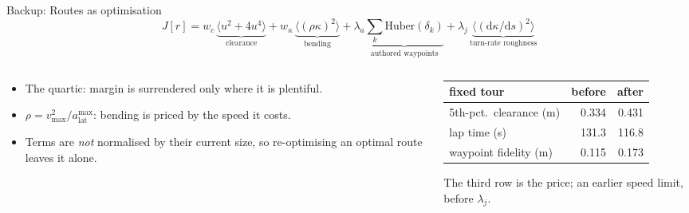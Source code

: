 \documentclass[10pt, aspectratio=169]{beamer}
\begin{document}
\begin{frame}{Backup: Routes as optimisation}
  \[
    J[r] = w_c\,\underbrace{\big\langle u^2+4u^4\big\rangle}_{\text{clearance}}
    + w_\kappa\,\underbrace{\big\langle(\rho\kappa)^2\big\rangle}_{\text{bending}}
    + \lambda_a\underbrace{\textstyle\sum_k\mathrm{Huber}(\delta_k)}_{\text{authored waypoints}}
    + \lambda_j\,\underbrace{\big\langle(\mathrm{d}\kappa/\mathrm{d}s)^2\big\rangle}_{\text{turn-rate roughness}}
  \]
  \begin{columns}[c]
    \begin{column}{0.5\textwidth}
      \small
      \begin{itemize}
        \item The quartic: margin is surrendered only where it is plentiful.
        \item $\rho=v_{\max}^2/a^{\max}_{\mathrm{lat}}$: bending is priced by the speed it costs.
        \item Terms are \emph{not} normalised by their current size, so re-optimising an optimal
              route leaves it alone.
      \end{itemize}
    \end{column}
    \begin{column}{0.46\textwidth}
      \centering\small
      \begin{tabular}{@{}l r r@{}}
        \toprule
        fixed tour & before & after \\
        \midrule
        5th-pct.\ clearance (m) & 0.334 & 0.431 \\
        lap time (s)            & 131.3 & 116.8 \\
        waypoint fidelity (m)   & 0.115 & 0.173 \\
        \bottomrule
      \end{tabular}

      \vspace{0.3em}
      {\scriptsize The third row is the price; an earlier speed limit, before $\lambda_j$.}
    \end{column}
  \end{columns}
\end{frame}
\end{document}
